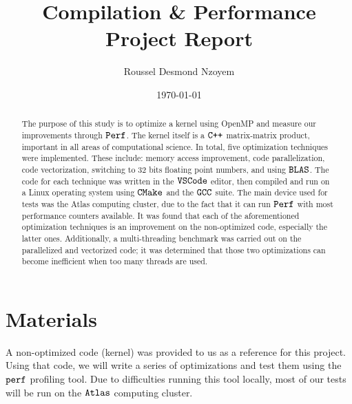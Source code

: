 \documentclass[a4paper, 10 pt, conference]{ieeeconf}
\title{\LARGE \bf
Compilation \& Performance Project Report}
\author{Roussel Desmond Nzoyem} %
\date{\today} %
\begin{document}
\maketitle
\thispagestyle{empty}
\pagestyle{empty}


\begin{abstract}

The purpose of this study is to optimize a kernel using OpenMP and measure our improvements through $\verb|Perf|$. The kernel itself is a $\verb|C++|$ matrix-matrix product, important in all areas of computational science. In total, five optimization techniques were implemented. These include: memory access improvement, code parallelization, code vectorization, switching to 32 bits floating point numbers, and using $\verb|BLAS|$. The code for each technique was written in the $\verb|VSCode|$ editor, then compiled and run on a Linux operating system using $\verb|CMake|$ and the $\verb|GCC|$ suite. The main device used for tests was the Atlas computing cluster, due to the fact that it can run $\verb|Perf|$ with most performance counters available. It was found that each of the aforementioned optimization techniques is an improvement on the non-optimized code, especially the latter ones. Additionally, a multi-threading benchmark was carried out on the parallelized and vectorized code; it was determined that those two optimizations can become inefficient when too many threads are used. 


\end{abstract}



\section{\textbf{Materials}}
A non-optimized code (kernel) was provided to us as a reference for this project. Using that code, we will write a series of optimizations and test them using the $\verb|perf|$ profiling tool. Due to difficulties running this tool locally, most of our tests will be run on the $\verb|Atlas|$ computing cluster. 

\end{document}
